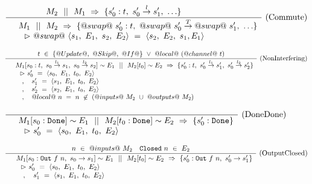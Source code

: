 
\newcommand\tup[1]
{ \langle #1 \rangle}

\begin{figure*}

\begin{center}
\end{center}

$$
\ruleI
{
 M_2 ~~||~~ M_1
~\Rightarrow~ 
        \{ s_0' : t,~ s_0' \stackrel{l}{\to} s_1',~ \ldots \} \\
}
{
\begin{array}{ll}
 & M_1  ~~||~~ M_2
~\Rightarrow~ 
        \{ @swap@~s_0' : t,~ @swap@~s_0' \stackrel{T}{\to} @swap@~s_1',~ \ldots \} \\
 & ~~ \rhd ~@swap@~\tup{s_1,~E_1,~s_2,~E_2}~=~\tup{s_2,~E_2,~s_1,E_1}
\end{array}
}
\textrm{(Commute)}
$$

$$
\ruleI
{
    t~\in~\{@Update@,~@Skip@,~@If@\}
    ~\vee~
    @local@~(@channel@~t)
}
{
\begin{array}{ll}
 & M_1  [  s_0  : t,~ s_0 \stackrel{l_1}{\to} s_1,~s_0 \stackrel{l_2}{\to} s_2]
        \sim E_1 ~~||~~ M_2[t_0] \sim E_2  
~\Rightarrow~ 
        \{ s_0' : t,~ s_0' \stackrel{l_1}{\to} s_1',~s_0' \stackrel{l_2}{\to} s_2'\} \\
 & ~~ \rhd ~s_0'  ~=~ \tup{ s_0,~ E_1,~ t_0,~ E_2 } \\
 & ~~~,  ~~~ s_1' ~=~ \tup{ s_1,~ E_1,~ t_0,~ E_2 } \\
 & ~~~,  ~~~ s_2' ~=~ \tup{ s_2,~ E_1,~ t_0,~ E_2 } \\
 & ~~~,  ~~~ @local@~n~=~n~\not\in~(@inputs@~M_2~\cup~@outputs@~M_2)
\end{array}
}
\textrm{(NonInterfering)}
$$

$$
\ruleI
{
}
{
\begin{array}{ll}
 & M_1  [  s_0  : \Done] \sim E_1 ~~||~~ M_2[t_0 : \Done] \sim E_2  
~\Rightarrow~ 
        \{ s_0' : \Done \} \\
 & ~~ \rhd ~s_0'  ~=~ \tup{ s_0,~ E_1,~ t_0,~ E_2 } \\
\end{array}
}
\textrm{(DoneDone)}
$$

$$
\ruleI
{
    n~\in~@inputs@~M_2
    \quad
    \Closed{n}~\in~E_2
}
{
\begin{array}{ll}
 & M_1  [  s_0  : \Out{f}{n},~ s_0 \to s_1]
        \sim E_1 ~~||~~ M_2[t_0] \sim E_2  
~\Rightarrow~ 
        \{ s_0' : \Out{f}{n},~ s_0' \to s_1'\} \\
 & ~~ \rhd ~s_0'  ~=~ \tup{ s_0,~ E_1,~ t_0,~ E_2 } \\
 & ~~~,  ~~~ s_1' ~=~ \tup{ s_1,~ E_1,~ t_0,~ E_2 } \\
\end{array}
}
\textrm{(OutputClosed)}
$$


\end{figure*}
